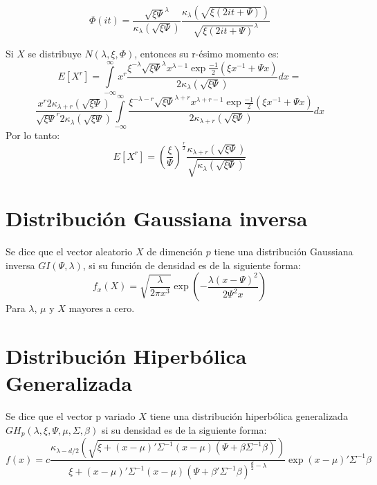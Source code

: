 \documentclass[11pt]{book}
\begin{document}
\begin{equation*}
\Phi(it)=\frac{\sqrt{\xi\Psi}^{\lambda}}{\kappa_{\lambda}(\sqrt{\xi\Psi})}\frac{\kappa_{\lambda}(\sqrt{\xi(2it + \Psi)})}{\sqrt{\xi(2it + \Psi)}^{\lambda}}
\end{equation*}

Si $X$ se distribuye $N\tilde{}(\lambda,\xi,\Phi)$, entonces su r-ésimo momento es:
\begin{equation*}
E[X^{r}]=\underset{-\infty }{\overset{\infty }{\int }}x^{r}\dfrac{\xi^{-\lambda}\sqrt{\xi\Psi}^{\lambda}x^{\lambda-1}\exp{\frac{-1}{2}(\xi x^{-1} + \Psi x)}}{2\kappa_{\lambda}(\sqrt{\xi\Psi})}dx=
\end{equation*}
\begin{equation*}
\frac{x^{r}2\kappa_{\lambda+r}(\sqrt{\xi\Psi})}{\sqrt{\xi\Psi}^{r}2\kappa_{\lambda}(\sqrt{\xi\Psi})}\underset{-\infty }{\overset{\infty }{\int }}\dfrac{\xi^{-\lambda-r}\sqrt{\xi\Psi}^{\lambda+r}x^{\lambda+r-1}\exp{\frac{-1}{2}(\xi x^{-1} + \Psi x)}}{2\kappa_{\lambda+r}(\sqrt{\xi\Psi})}dx
\end{equation*}
Por lo tanto:
\begin{equation*}
E[X^{r}]=(\frac{\xi}{\Psi})^{\frac{r}{2}}\frac{\kappa_{\lambda+r}(\sqrt{\xi \Psi})}{\sqrt{\kappa_{\lambda}(\sqrt{\xi\Psi})}}
\end{equation*}

\section*{Distribución Gaussiana inversa}
Se dice que el vector aleatorio $X$ de dimención $p$ tiene una distribución Gaussiana inversa $GI(\Psi,\lambda)$, si su función de densidad es de la siguiente forma:
\begin{equation*}
f_{x}(X)=\sqrt{\dfrac{\lambda}{2\pi x^{3}}}\exp(-\dfrac{\lambda(x-\Psi)^{2}}{2\Psi^{2}x})
\end{equation*}
Para $\lambda$, $\mu$ y $X$ mayores a cero.

\section*{Distribución Hiperbólica Generalizada}
Se dice que el vector p variado $X$ tiene una distribución hiperbólica generalizada $GH_{p}(\lambda,\xi,\Psi,\mu,\Sigma,\beta)$ si su densidad es de la siguiente forma:
\begin{equation*}
f(x)=c\frac{\kappa_{\lambda-d/2}(\sqrt{\xi +(x-\mu)'\Sigma^{-1}(x-\mu)(\Psi+\beta\acute{}\Sigma^{-1}\beta)})}{\xi + (x-\mu)'\Sigma^{-1}(x-\mu)(\Psi+\beta'\Sigma^{-1}\beta)^{\frac{d}{2}-\lambda}}\exp{(x-\mu)'\Sigma^{-1}\beta}
\end{equation*}
\end{document}
